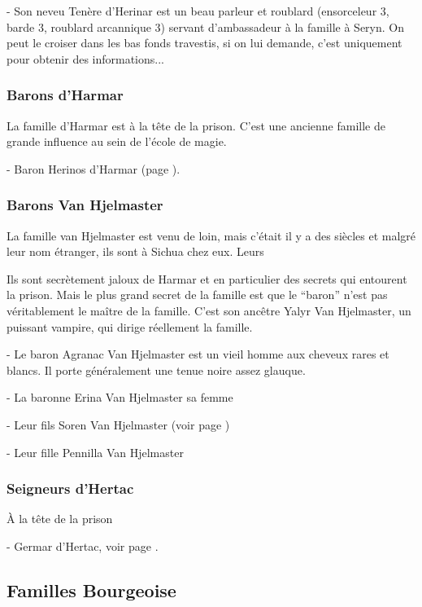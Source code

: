 - Son neveu Tenère d'Herinar est un beau parleur et roublard (ensorceleur 3, 
  barde 3, roublard arcannique 3) servant d'ambassadeur à la famille à Seryn.
  On peut le croiser dans les bas fonds travestis, si on lui demande, c'est 
  uniquement pour obtenir des informations...

\subsubsection*{Barons d'Harmar}

La famille d'Harmar est à la tête de la prison. C'est une ancienne famille de 
grande influence au sein de l'école de magie.

- Baron Herinos d'Harmar (page \pageref{ErinosdHarmar}).

\subsubsection*{Barons Van Hjelmaster}

La famille van Hjelmaster est venu de loin, mais c'était il y a des 
siècles et malgré leur nom étranger, ils sont à Sichua chez eux. Leurs

Ils sont secrètement jaloux de Harmar et en particulier des secrets
qui entourent la prison. Mais le plus grand secret de la famille est
que le ``baron'' n'est pas véritablement le maître de la famille. C'est
son ancêtre Yalyr Van Hjelmaster, un puissant vampire, qui dirige réellement
la famille.

- Le baron Agranac Van Hjelmaster est un vieil homme aux cheveux rares
et blancs. Il porte généralement une tenue noire assez glauque. 

- La baronne Erina Van Hjelmaster sa femme

- Leur fils Soren Van Hjelmaster (voir page \pageref{SorenVH})

- Leur fille Pennilla Van Hjelmaster

\subsubsection*{Seigneurs d'Hertac}

À la tête de la prison

 - Germar d'Hertac, voir page \pageref{GermardHertac}. 

\subsection*{Familles Bourgeoise}

